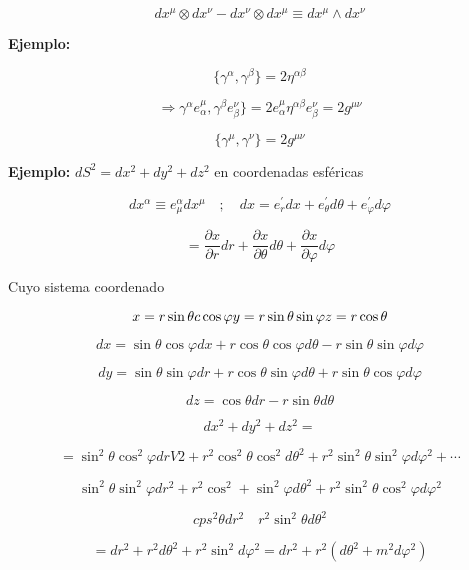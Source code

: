 \documentclass{report}
\begin{document}
{\begin{equation}
dx^{\mu} \otimes dx^{\nu} - dx^{\nu} \otimes dx^{\mu} \equiv dx^{\mu} \wedge dx^{\nu}
\end{equation}


\textbf{Ejemplo:}

\[\lbrace \gamma^{\alpha} , \gamma^{\beta} \rbrace = 2 \eta ^{\alpha \beta }\]

\[\Rightarrow \gamma^{\alpha } e_{\alpha} ^{\mu} , \gamma ^{\beta} e_{\beta} ^{\nu} \rbrace = 2 e_{\alpha}^{\mu} \eta ^{\alpha \beta}e_{\beta} ^{\nu} =2g^{\mu \nu }\]

\begin{equation}
\lbrace \gamma^{\mu} , \gamma^{\nu}\rbrace= 2 g^{\mu \nu }
\end{equation}

\textbf{Ejemplo:} $dS^2 = dx^2 + dy^2 + dz ^2 $ en coordenadas esféricas

\[dx^{\alpha} \equiv e_{\mu}^{\alpha} dx^{\mu} \quad ; \quad dx = e_{r}^{\prime} dx + e_{\theta}^{\prime } d \theta + e_{\varphi} ^{\prime} d \varphi \]

\[= \frac{\partial x}{\partial r} dr + \frac{\partial x}{\partial \theta}d \theta + \frac{\partial x}{\partial \varphi} d \varphi \]

Cuyo sistema coordenado

\[x =r \sin \theta c\cos \varphi \\ 
y=r \sin \theta \sin \varphi \\
z = r \cos \theta\]

\[dx = \sin \theta \cos \varphi dx + r\cos \theta \cos\varphi d\theta - r \sin \theta \sin \varphi d \varphi \]

\[dy= \sin \theta \sin \varphi dr + r \cos \theta \sin \varphi d \theta + r \sin \theta \cos \varphi d \varphi \]

\[dz = \cos \theta dr-r \sin \theta d \theta \]

\[dx^2 + dy^2 + dz^2 =\]

\[=\sin ^2 \theta \cos ^2 \varphi dr V2 + r^2 \cos ^2 \theta \cos ^2 d \theta ^2 + r^2 \sin^2 \theta \sin ^2 \varphi d \varphi ^2 + \cdots \]

\[\sin ^2 \theta \sin^2 \varphi dr^2 + r^2 \cos ^2 + \sin^2 \varphi d \theta^2 + r^2 \sin^2 \theta \cos^2 \varphi d \varphi ^2\]

\[cps^2 \theta dr^2 \quad r^2 \sin^2 \theta d \theta ^2\]

\[= dr^2 + r^2 d\theta ^2 + r^2 \sin^2 d \varphi ^2 = dr^2 + r^2 (d \theta ^2 + m^2 d \varphi^2 )\]

}
\end{document}
